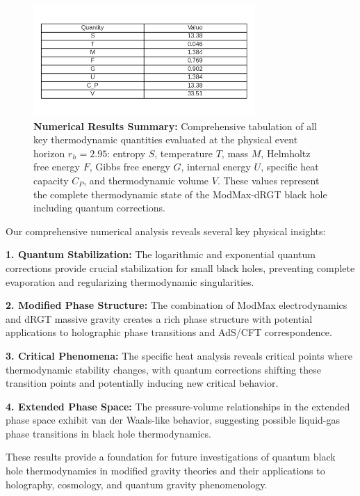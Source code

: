 \documentclass[superscriptaddress, prd, aps,amsmath,amssymb,showpacs,showkeys, onecolumn]{revtex4-2}
\begin{document}
\begin{figure}[H]
    \centering
    \includegraphics[width=0.75\textwidth]{figures/figure_4.png}
    \caption{\textbf{Numerical Results Summary:} Comprehensive tabulation of all key thermodynamic quantities evaluated at the physical event horizon $r_h = 2.95$: entropy $S$, temperature $T$, mass $M$, Helmholtz free energy $F$, Gibbs free energy $G$, internal energy $U$, specific heat capacity $C_P$, and thermodynamic volume $V$. These values represent the complete thermodynamic state of the ModMax-dRGT black hole including quantum corrections.}
    \label{fig:notebook_fig4}
\end{figure}

Our comprehensive numerical analysis reveals several key physical insights:

\textbf{1. Quantum Stabilization:} The logarithmic and exponential quantum corrections provide crucial stabilization for small black holes, preventing complete evaporation and regularizing thermodynamic singularities.

\textbf{2. Modified Phase Structure:} The combination of ModMax electrodynamics and dRGT massive gravity creates a rich phase structure with potential applications to holographic phase transitions and AdS/CFT correspondence.

\textbf{3. Critical Phenomena:} The specific heat analysis reveals critical points where thermodynamic stability changes, with quantum corrections shifting these transition points and potentially inducing new critical behavior.

\textbf{4. Extended Phase Space:} The pressure-volume relationships in the extended phase space exhibit van der Waals-like behavior, suggesting possible liquid-gas phase transitions in black hole thermodynamics.

These results provide a foundation for future investigations of quantum black hole thermodynamics in modified gravity theories and their applications to holography, cosmology, and quantum gravity phenomenology.
\end{document}
